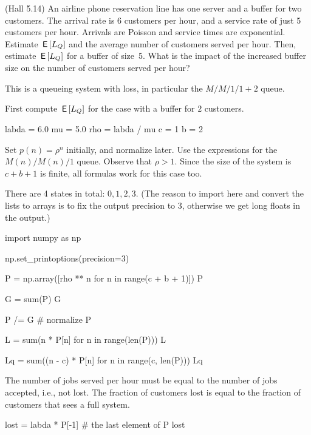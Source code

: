 \documentclass[companion]{subfiles}
\begin{document}
\begin{extra}
 (Hall 5.14) An airline phone reservation line has one server and a buffer for two customers.
 The arrival rate is 6 customers per hour, and a service rate of just 5 customers per hour.
 Arrivals are Poisson and service times are exponential.
 Estimate $\,\mathsf{E}\left[L_Q\right]$ and the average number of customers served per hour.
 Then, estimate $\,\mathsf{E}\left[L_Q\right]$ for a buffer of size~5.
 What is the impact of the increased buffer size on the number of customers served per hour?
\begin{hint}
This is a queueing system with loss, in particular the $M/M/1/1+2$ queue.
\end{hint}
\begin{solution}
First compute $\,\mathsf{E}\left[L_Q\right]$ for the case with a buffer for $2$ customers.

\begin{pyconsole}
labda = 6.0
mu = 5.0
rho = labda / mu
c = 1
b = 2
\end{pyconsole} 

Set $p(n) = \rho^n$ initially, and normalize later. Use the
expressions for the $M(n)/M(n)/1$ queue. Observe that $\rho>1$. Since
the size of the system is $c+b+1$ is finite, all formulas work for
this case too.


There are 4 states in total: $0,1,2,3$. (The reason to import  here and convert the lists to arrays is to fix the output precision to 3, otherwise we get long floats in the output.)

\begin{pyconsole}
import numpy as np

np.set_printoptions(precision=3)

P = np.array([rho ** n for n in range(c + b + 1)])
P

G = sum(P)
G

P /= G  # normalize
P
\end{pyconsole} 

\begin{pyconsole}
L = sum(n * P[n] for n in range(len(P)))
L

Lq = sum((n - c) * P[n] for n in range(c, len(P)))
Lq
\end{pyconsole} 


The number of jobs served per hour must be equal to the number of jobs
accepted, i.e., not lost. The fraction of customers lost is equal to
the fraction of customers that sees a full system.

\begin{pyconsole}
lost = labda * P[-1]  # the last element of P
lost


\end{pyconsole}
\end{solution}
\end{extra}
\end{document}
